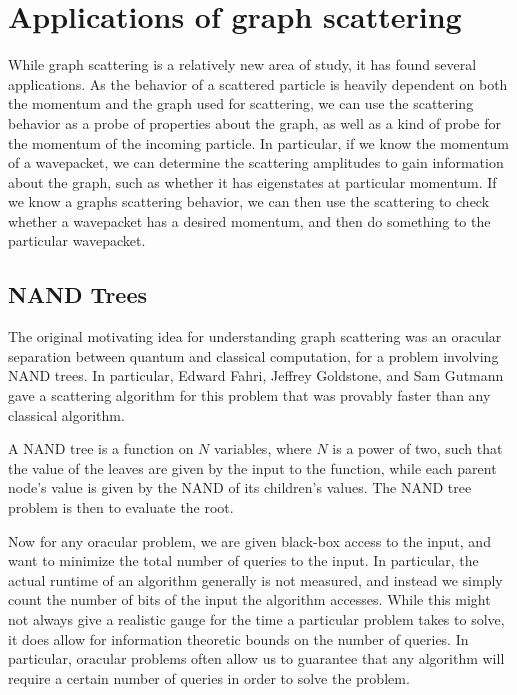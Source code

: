 \documentclass[../thesis-main/thesis-main]{subfiles}
\begin{document}
\section{Applications of graph scattering}

While graph scattering is a relatively new area of study, it has found several applications.  As the behavior of a scattered particle is heavily dependent on both the momentum and the graph used for scattering, we can use the scattering behavior as a probe of properties about the graph, as well as a kind of probe for the momentum of the incoming particle.  In particular, if we know the momentum of a wavepacket, we can determine the scattering amplitudes to gain information about the graph, such as whether it has eigenstates at particular momentum.  If we know a graphs scattering behavior, we can then use the scattering to check whether a wavepacket has a desired momentum, and then do something to the particular wavepacket.

\subsection{NAND Trees}

The original motivating idea for understanding graph scattering was an oracular separation between quantum and classical computation, for a problem involving NAND trees.  In particular, Edward Fahri, Jeffrey Goldstone, and Sam Gutmann gave a scattering algorithm \cite{FGG08} for this problem that was provably faster than any classical algorithm.

A NAND tree is a function on $N$ variables, where $N$ is a power of two, such that the value of the leaves are given by the input to the function, while each parent node's value is given by the NAND of its children's values.  The NAND tree problem is then to evaluate the root.  

Now for any oracular problem, we are given black-box access to the input, and want to minimize the total number of queries to the input.  In particular, the actual runtime of an algorithm generally is not measured, and instead we simply count the number of bits of the input the algorithm accesses.  While this might not always give a realistic gauge for the time a particular problem takes to solve, it does allow for information theoretic bounds on the number of queries.  In particular, oracular problems often allow us to guarantee that any algorithm will require a certain number of queries in order to solve the problem.
\end{document}
